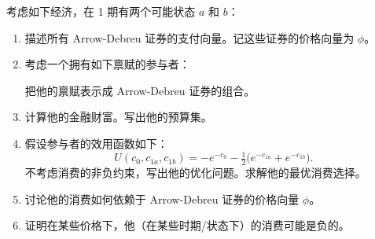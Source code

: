 \begin{problem}
 考虑如下经济，在 1 期有两个可能状态 $a$ 和 $b$：
\begin{center}
\end{center}
\begin{enumerate}[label=(\alph*)]
    \item 描述所有 Arrow-Debreu 证券的支付向量。记这些证券的价格向量为 $\phi$。
    \item 考虑一个拥有如下禀赋的参与者：
    \begin{center}
    \end{center}
    把他的禀赋表示成 Arrow-Debreu 证券的组合。
    \item 计算他的金融财富。写出他的预算集。
    \item 假设参与者的效用函数如下：
    \[
        U(c_{0},c_{1a},c_{1b})=-e^{-c_{0}}-\tfrac12\bigl(e^{-c_{1a}}+e^{-c_{1b}}\bigr).
    \]
    不考虑消费的非负约束，写出他的优化问题。求解他的最优消费选择。
    \item 讨论他的消费如何依赖于 Arrow-Debreu 证券的价格向量 $\phi$。
    \item 证明在某些价格下，他（在某些时期/状态下）的消费可能是负的。
\end{enumerate}
\end{problem}
